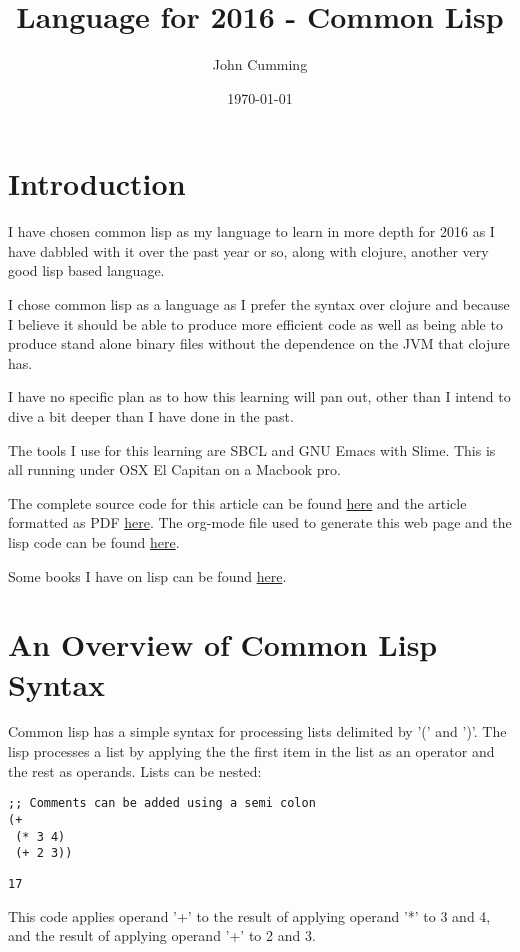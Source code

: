\documentclass[11pt]{article}
\author{John Cumming}
\date{\today}
\title{Language for 2016 - Common Lisp}
\begin{document}
\maketitle
\tableofcontents


\section{Introduction}
\label{sec-1}

I have chosen common lisp as my language to learn in more depth for
2016 as I have dabbled with it over the past year or so, along with
clojure, another very good lisp based language.

I chose common lisp as a language as I prefer the syntax over
clojure and because I believe it should be able to produce more
efficient code as well as being able to produce stand alone binary
files without the dependence on the JVM that clojure has.

I have no specific plan as to how this learning will pan out, other
than I intend to dive a bit deeper than I have done in the past.

The tools I use for this learning are SBCL and GNU Emacs with
Slime. This is all running under OSX El Capitan on a Macbook pro.

The complete source code for this article can be found \href{2016-lisp.lisp}{here} and the
article formatted as PDF \href{2016-lisp.pdf}{here}. The org-mode file used to generate
this web page and the lisp code can be found \href{2016-lisp.org}{here}.

Some books I have on lisp can be found \href{books.org}{here}.

\section{An Overview of Common Lisp Syntax}
\label{sec-2}

Common lisp has a simple syntax for processing lists delimited by '('
and ')'. The lisp processes a list by applying the the first item in
the list as an operator and the rest as operands. Lists can be
nested:

\begin{verbatim}
;; Comments can be added using a semi colon
(+
 (* 3 4)
 (+ 2 3))
\end{verbatim}
\begin{verbatim}
17
\end{verbatim}

This code applies operand '+' to the result of applying operand '*'
to 3 and 4, and the result of applying operand '+' to 2 and 3.
\end{document}
